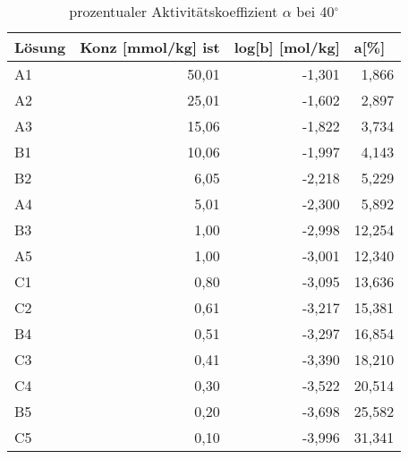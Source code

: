 \begin{table}[H]
  \centering
  \caption{prozentualer Aktivitätskoeffizient $\alpha$ bei 40$^\circ$}
    \begin{tabular}{lrrr}
    \toprule
    \textbf{Lösung} & \multicolumn{1}{l}{\textbf{Konz [mmol/kg] ist}} & \multicolumn{1}{l}{\textbf{log[b] [mol/kg]}} & \multicolumn{1}{l}{\textbf{a[\%]}} \\
    \midrule
    A1    & 50,01 & -1,301 & 1,866 \\
    A2    & 25,01 & -1,602 & 2,897 \\
    A3    & 15,06 & -1,822 & 3,734 \\
    B1    & 10,06 & -1,997 & 4,143 \\
    B2    & 6,05  & -2,218 & 5,229 \\
    A4    & 5,01  & -2,300 & 5,892 \\
    B3    & 1,00  & -2,998 & 12,254 \\
    A5    & 1,00  & -3,001 & 12,340 \\
    C1    & 0,80  & -3,095 & 13,636 \\
    C2    & 0,61  & -3,217 & 15,381 \\
    B4    & 0,51  & -3,297 & 16,854 \\
    C3    & 0,41  & -3,390 & 18,210 \\
    C4    & 0,30  & -3,522 & 20,514 \\
    B5    & 0,20  & -3,698 & 25,582 \\
    C5    & 0,10  & -3,996 & 31,341 \\
    \bottomrule
    \end{tabular}%
  \label{tab:addlabel}%
\end{table}%
